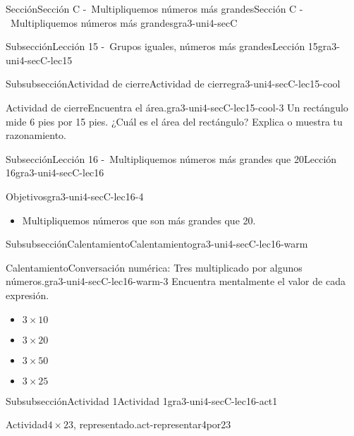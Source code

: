 \documentclass[twoside,14pt,]{extarticle}
\begin{document}
\begin{sectionptx}{Sección}{Sección C -~Multipliquemos números más grandes}{}{Sección C -~Multipliquemos números más grandes}{}{}{gra3-uni4-secC}
\begin{subsectionptx}{Subsección}{Lección 15 -~Grupos iguales, números más grandes}{}{Lección 15}{}{}{gra3-uni4-secC-lec15}
\begin{subsubsectionptx}{Subsubsección}{Actividad de cierre}{}{Actividad de cierre}{}{}{gra3-uni4-secC-lec15-cool}
\begin{project}{Actividad de cierre}{Encuentra el área.}{gra3-uni4-secC-lec15-cool-3}%
Un rectángulo mide 6 pies por 15 pies. ¿Cuál es el área del rectángulo? Explica o muestra tu razonamiento.%
\end{project}%
\end{subsubsectionptx}
\end{subsectionptx}
%
%
\typeout{************************************************}
\typeout{************************************************}
%
\begin{subsectionptx}{Subsección}{Lección 16 -~Multipliquemos números más grandes que 20}{}{Lección 16}{}{}{gra3-uni4-secC-lec16}
\begin{objectives}{Objetivos}{gra3-uni4-secC-lec16-4}
%
\begin{itemize}[label=\textbullet]
\item{}Multipliquemos números que son más grandes que 20.%
\end{itemize}
\end{objectives}
%
%
\typeout{************************************************}
\typeout{************************************************}
%
\begin{subsubsectionptx}{Subsubsección}{Calentamiento}{}{Calentamiento}{}{}{gra3-uni4-secC-lec16-warm}
\begin{exploration}{Calentamiento}{Conversación numérica: Tres multiplicado por algunos números.}{gra3-uni4-secC-lec16-warm-3}%
Encuentra mentalmente el valor de cada expresión.%
%
\begin{itemize}[label=\textbullet]
\item{}\(\displaystyle 3\times 10\)%
\item{}\(\displaystyle 3\times 20\)%
\item{}\(\displaystyle 3\times 50\)%
\item{}\(\displaystyle 3\times 25\)%
\end{itemize}
\end{exploration}%
\end{subsubsectionptx}
%
%
\typeout{************************************************}
\typeout{************************************************}
%
\begin{subsubsectionptx}{Subsubsección}{Actividad 1}{}{Actividad 1}{}{}{gra3-uni4-secC-lec16-act1}
\begin{activity}{Actividad}{\(4\times 23\), representado.}{act-representar4por23}%

\end{activity}
\end{subsubsectionptx}
\end{subsectionptx}
\end{sectionptx}
\end{document}
